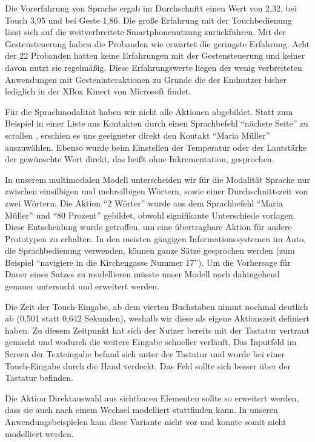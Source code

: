 Die Vorerfahrung von Sprache ergab im Durchschnitt einen Wert von 2,32, bei Touch 3,95 und bei Geste 1,86.
Die große Erfahrung mit der Touchbedienung lässt sich auf die weitverbreitete Smartphonenutzung zurückführen.
Mit der Gestensteuerung haben die Probanden wie erwartet die geringste Erfahrung.
Acht der 22 Probanden hatten keine Erfahrungen mit der Gestensteuerung und keiner davon nutzt sie regelmäßig.
Diese Erfahrungswerte liegen der wenig verbreiteten Anwendungen mit Gesteninteraktionen zu Grunde die der Endnutzer bisher lediglich in der XBox Kinect von Microsoft findet.

Für die Sprachmodalität haben wir nicht alle Aktionen abgebildet.
Statt zum Beispiel in einer Liste aus Kontakten durch einen Sprachbefehl "`nächste Seite"' zu scrollen , erschien es uns geeigneter direkt den Kontakt "`Maria Müller"' auszuwählen.
Ebenso wurde beim Einstellen der Temperatur oder der Lautstärke der gewünschte Wert direkt, das heißt ohne Inkrementation, gesprochen.

In unserem multimodalen Modell unterscheiden wir für die Modalität Sprache nur zwischen einsilbigen und mehrsilbigen Wörtern, sowie einer Durchschnittszeit von zwei Wörtern.
Die Aktion "`2 Wörter"' wurde aus dem Sprachbefehl "`Maria Müller"' und "`80 Prozent"' gebildet, obwohl signifikante Unterschiede vorlagen.
Diese Entscheidung wurde getroffen, um eine übertragbare Aktion für andere Prototypen zu erhalten.
In den meisten gängigen Informationssystemen im Auto, die Sprachbedienung verwenden, können ganze Sätze gesprochen werden (zum Beispiel "`navigiere in die Kirchengasse Nummer 17"').
Um die Vorhersage für Dauer eines Satzes zu modellieren müsste unser Modell noch dahingehend genauer untersucht und erweitert werden.

Die Zeit der Touch-Eingabe, ab dem vierten Buchstaben nimmt nochmal deutlich ab (0,501 statt 0,642 Sekunden), weshalb wir diese als eigene Aktionszeit definiert haben.
Zu diesem Zeitpunkt hat sich der Nutzer bereits mit der Tastatur vertraut gemacht und wodurch die weitere Eingabe schneller verläuft.
Das Inputfeld im Screen der Texteingabe befand sich unter der Tastatur und wurde bei einer Touch-Eingabe durch die Hand verdeckt.
Das Feld sollte sich besser über der Tastatur befinden.

Die Aktion Direktauswahl aus sichtbaren Elementen sollte so erweitert werden, dass sie auch nach einem Wechsel modelliert stattfinden kann.
In unseren Anwendungsbeispielen kam diese Variante nicht vor und konnte somit nicht modelliert werden.

